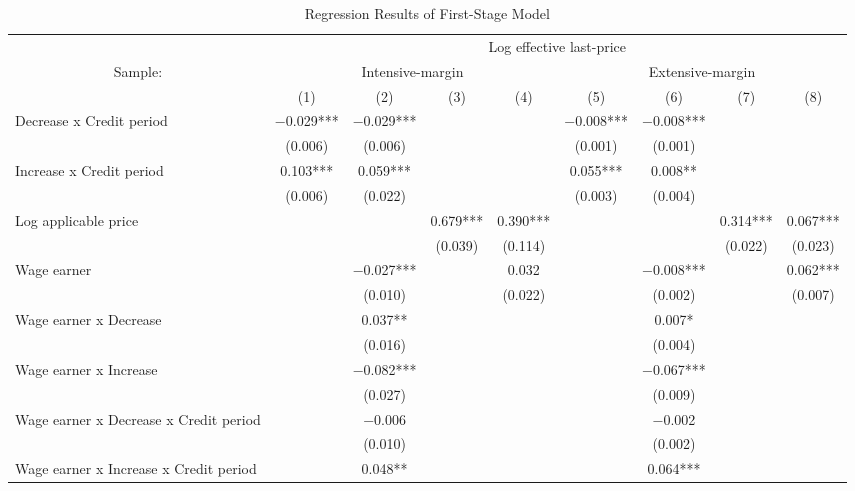 
\begin{landscape}\begin{table}

\caption{Regression Results of First-Stage Model\label{tab:fe2sls-stage1}}
\centering
\fontsize{8}{10}\selectfont
\begin{threeparttable}
\begin{tabular}[t]{lcccccccc}
\toprule
\multicolumn{1}{c}{ } & \multicolumn{8}{c}{Log effective last-price} \\
\cmidrule(l{3pt}r{3pt}){2-9}
\multicolumn{1}{c}{Sample:} & \multicolumn{4}{c}{Intensive-margin} & \multicolumn{4}{c}{Extensive-margin} \\
\cmidrule(l{3pt}r{3pt}){1-1} \cmidrule(l{3pt}r{3pt}){2-5} \cmidrule(l{3pt}r{3pt}){6-9}
  & (1) & (2) & (3) & (4) & (5) & (6) & (7) & (8)\\
\midrule
Decrease x Credit period & \num{-0.029}*** & \num{-0.029}*** &  &  & \num{-0.008}*** & \num{-0.008}*** &  & \\
 & (\num{0.006}) & (\num{0.006}) &  &  & (\num{0.001}) & (\num{0.001}) &  & \\
Increase x Credit period & \num{0.103}*** & \num{0.059}*** &  &  & \num{0.055}*** & \num{0.008}** &  & \\
 & (\num{0.006}) & (\num{0.022}) &  &  & (\num{0.003}) & (\num{0.004}) &  & \\
Log applicable price &  &  & \num{0.679}*** & \num{0.390}*** &  &  & \num{0.314}*** & \num{0.067}***\\
 &  &  & (\num{0.039}) & (\num{0.114}) &  &  & (\num{0.022}) & (\num{0.023})\\
Wage earner &  & \num{-0.027}*** &  & \num{0.032} &  & \num{-0.008}*** &  & \num{0.062}***\\
 &  & (\num{0.010}) &  & (\num{0.022}) &  & (\num{0.002}) &  & (\num{0.007})\\
Wage earner x Decrease &  & \num{0.037}** &  &  &  & \num{0.007}* &  & \\
 &  & (\num{0.016}) &  &  &  & (\num{0.004}) &  & \\
Wage earner x Increase &  & \num{-0.082}*** &  &  &  & \num{-0.067}*** &  & \\
 &  & (\num{0.027}) &  &  &  & (\num{0.009}) &  & \\
Wage earner x Decrease x Credit period &  & \num{-0.006} &  &  &  & \num{-0.002} &  & \\
 &  & (\num{0.010}) &  &  &  & (\num{0.002}) &  & \\
Wage earner x Increase x Credit period &  & \num{0.048}** &  &  &  & \num{0.064}*** &  & \\

\end{tabular}
\end{threeparttable}
\end{table}
\end{landscape}
